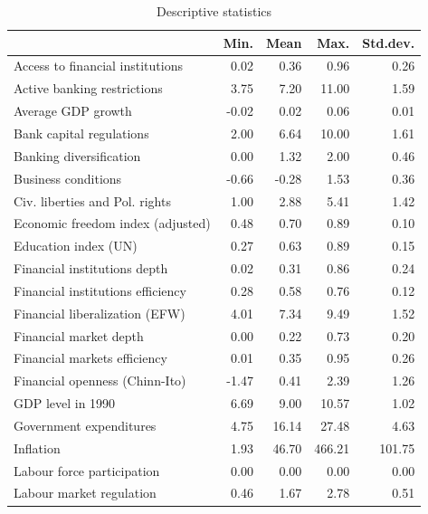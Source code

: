 \begin{refsection}
\begin{subappendices}
    \begin{table}[!ht]
    \caption{Descriptive statistics}\label{ch3tab:desc_stat}
    \centering
    \begin{tabular}{lrrrr}
      \toprule
         & Min. & Mean & Max. & Std.dev. \\ 
      \midrule
      Access to financial institutions & 0.02 & 0.36 & 0.96 & 0.26 \\ 
      Active banking restrictions & 3.75 & 7.20 & 11.00 & 1.59 \\ 
      Average GDP growth & -0.02 & 0.02 & 0.06 & 0.01 \\ 
      Bank capital regulations & 2.00 & 6.64 & 10.00 & 1.61 \\ 
      Banking diversification & 0.00 & 1.32 & 2.00 & 0.46 \\ 
      Business conditions & -0.66 & -0.28 & 1.53 & 0.36 \\ 
      Civ. liberties and Pol. rights & 1.00 & 2.88 & 5.41 & 1.42 \\ 
      Economic freedom index (adjusted) & 0.48 & 0.70 & 0.89 & 0.10 \\ 
      Education index (UN) & 0.27 & 0.63 & 0.89 & 0.15 \\ 
      Financial institutions depth & 0.02 & 0.31 & 0.86 & 0.24 \\ 
      Financial institutions efficiency & 0.28 & 0.58 & 0.76 & 0.12 \\ 
      Financial liberalization (EFW) & 4.01 & 7.34 & 9.49 & 1.52 \\ 
      Financial market depth & 0.00 & 0.22 & 0.73 & 0.20 \\ 
      Financial markets efficiency & 0.01 & 0.35 & 0.95 & 0.26 \\ 
      Financial openness (Chinn-Ito) & -1.47 & 0.41 & 2.39 & 1.26 \\ 
      GDP level in 1990 & 6.69 & 9.00 & 10.57 & 1.02 \\ 
      Government expenditures & 4.75 & 16.14 & 27.48 & 4.63 \\ 
      Inflation & 1.93 & 46.70 & 466.21 & 101.75 \\ 
      Labour force participation & 0.00 & 0.00 & 0.00 & 0.00 \\ 
      Labour market regulation & 0.46 & 1.67 & 2.78 & 0.51 \\ 

\end{tabular}
\end{table}
\end{subappendices}
\end{refsection}
